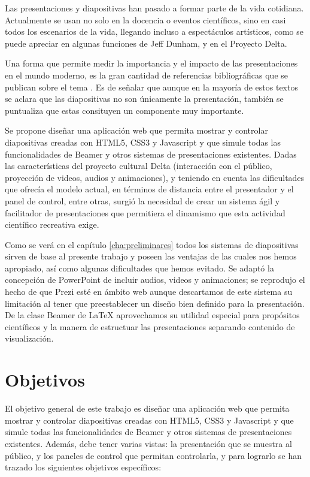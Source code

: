 \begin{introduction}

	Las presentaciones y diapositivas han pasado a formar parte de la vida cotidiana. Actualmente se usan no solo en la docencia o eventos científicos, sino en casi todos los escenarios de la vida, llegando incluso a espectáculos artísticos, como se puede apreciar en algunas funciones de Jeff Dunham, y en el Proyecto Delta.


	Una forma que permite medir la importancia y el impacto de las presentaciones en el mundo moderno, es la gran cantidad de referencias bibliográficas que se publican sobre el tema \cite{alley} \cite{duarte} \cite{tufte}. Es de señalar que aunque en la mayoría de estos textos se aclara que las diapositivas no son únicamente la presentación, también se puntualiza que estas consituyen un componente muy importante.

	Se propone diseñar una aplicación web que permita mostrar y controlar diapositivas creadas con HTML5, CSS3 y Javascript y que simule todas las funcionalidades de Beamer y otros sistemas de presentaciones existentes. Dadas las características del proyecto cultural Delta (interacción con el público, proyección de videos, audios y animaciones), y teniendo en cuenta las dificultades que ofrecía el modelo actual, en términos de distancia entre el presentador y el panel de control, entre otras, surgió la necesidad de crear un sistema ágil y facilitador de presentaciones que permitiera el dinamismo que esta actividad científico recreativa exige.

	Como se verá en el capítulo \ref{cha:preliminares} todos los sistemas de diapositivas sirven de base al presente trabajo y poseen las ventajas de las cuales nos hemos apropiado, así como algunas dificultades que hemos evitado. Se adaptó la concepción de PowerPoint de incluir audios, videos y animaciones; se reprodujo el hecho de que Prezi esté en ámbito web aunque descartamos de este sistema su limitación al tener que preestablecer un diseño bien definido para la presentación. De la clase Beamer de \LaTeX{} aprovechamos su utilidad especial para propósitos científicos y la manera de estructuar las presentaciones separando contenido de visualización.

	\section{Objetivos} %
	\label{sec:objetivos}

		El objetivo general de este trabajo es diseñar una aplicación web que permita mostrar y controlar diapositivas creadas con HTML5, CSS3 y Javascript y que simule todas las funcionalidades de Beamer y otros sistemas de presentaciones existentes. Además, debe tener varias vistas: la presentación que se muestra al público, y los paneles de control que permitan controlarla, y para lograrlo se han trazado los siguientes objetivos específicos:


\end{introduction}
